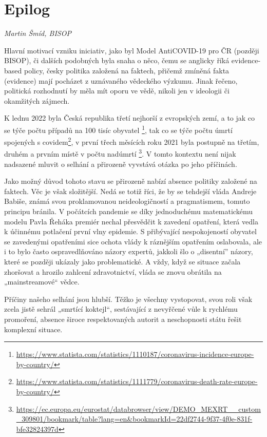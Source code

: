 \chapter{Epilog}

\textit{Martin Šmíd, BISOP}

\vspace{15mm}

Hlavní motivací vzniku iniciativ, jako byl Model AntiCOVID-19 pro ČR (později BISOP), či dalších podobných byla snaha o něco, čemu se anglicky říká evidence-based policy, česky politika založená na faktech, přičemž zmíněná fakta (evidence) mají pocházet z uznávaného vědeckého výzkumu. Jinak řečeno, politická rozhodnutí by měla mít oporu ve vědě, nikoli jen v ideologii či okamžitých zájmech. 

K lednu 2022 byla Česká republika třetí nejhorší z evropských zemí, a to jak co se týče počtu případů na 100 tisíc obyvatel \footnote{\url{https://www.statista.com/statistics/1110187/coronavirus-incidence-europe-by-country/}}, tak co se týče počtu úmrtí spojených s covidem\footnote{\url{https://www.statista.com/statistics/1111779/coronavirus-death-rate-europe-by-country/}}, v první třech měsících roku 2021 byla postupně na třetím, druhém a prvním místě v počtu nadúmrtí \footnote{\url{https://ec.europa.eu/eurostat/databrowser/view/DEMO_MEXRT__custom_309801/bookmark/table?lang=en&bookmarkId=22df2744-9f37-4f0e-831f-bfe32824397d}}. V tomto kontextu není nijak nadsazené mluvit o selhání a přirozeně vyvstává otázka po jeho příčinách. 

Jako možný důvod tohoto stavu se přirozeně nabízí absence politiky založené na faktech. Věc je však složitější. Nedá se totiž říci, že by se tehdejší vláda Andreje Babiše, známá svou proklamovanou neideologičností a pragmatismem, tomuto principu bránila. V počátcích pandemie se díky jednoduchému matematickému modelu Pavla Řeháka premiér nechal přesvědčit k zavedení opatření, která vedla k účinnému potlačení první vlny epidemie. S přibývající nespokojeností obyvatel se zavedenými opatřeními sice ochota vlády k ráznějším opatřením oslabovala, ale i to bylo často ospravedlňováno názory expertů, jakkoli šlo o „disentní” názory, které se později ukázaly jako problematické. A vždy, když se situace začala zhoršovat a hrozilo zahlcení zdravotnictví, vláda se znovu obrátila na „mainstreamové“ vědce.

Příčiny našeho selhání jsou hlubší. Těžko je všechny vystopovat, svou roli však zcela jistě sehrál „smrtící koktejl“, sestávající z nevyřčené vůle k rychlému promoření, absence široce respektovaných autorit a neschopnosti státu řešit komplexní situace.

